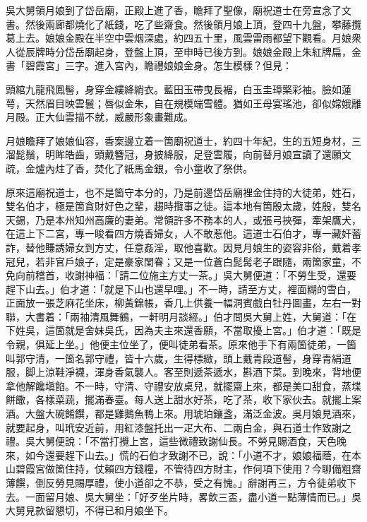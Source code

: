 吳大舅領月娘到了岱岳廟，正殿上進了香，瞻拜了聖像，廟祝道士在旁宣念了文書。然後兩廊都燒化了紙錢，吃了些齋食。然後領月娘上頂，登四十九盤，攀藤攬葛上去。娘娘金殿在半空中雲烟深處，約四五十里，風雲雷雨都望下觀看。{}月娘衆人從辰牌時分岱岳廟起身，登盤上頂，至申時已後方到。娘娘金殿上朱紅牌扁，金書「碧霞宮」三字。進入宮內，瞻禮娘娘金身。怎生模樣？但見：

\begin{myquote}
頭綰九龍飛鳳髻，身穿金縷絳綃衣。藍田玉帶曳長裾，白玉圭璋檠彩袖。臉如蓮萼，天然眉目映雲鬟；唇似金朱，自在規模端雪體。猶如王母宴瑤池，卻似嫦娥離月殿。正大仙雲描不就，威嚴形象畫難成。
\end{myquote}

月娘瞻拜了娘娘仙容，香案邊立着一箇廟祝道士，約四十年紀，生的五短身材，三溜髭鬚，明眸皓齒，頭戴簪冠，身披絳服，足登雲履，向前替月娘宣讀了還願文疏，金爐內炷了香，焚化了紙馬金銀，令小童收了祭供。

原來這廟祝道士，也不是箇守本分的，乃是前邊岱岳廟裡金住持的大徒弟，姓石，雙名伯才，極是箇貪財好色之輩，趨時攬事之徒。這本地有箇殷太歲，姓殷，雙名天錫，乃是本州知州高廉的妻弟。常領許多不務本的人，或張弓挾彈，牽架鷹犬，在這上下二宮，專一睃看四方燒香婦女，{}人不敢惹他。這道士石伯才，專一藏奸蓄詐，替他賺誘婦女到方丈，任意姦淫，取他喜歡。因見月娘生的姿容非俗，戴着孝冠兒，若非官戶娘子，定是豪家閨眷；又是一位蒼白髭髯老子跟隨，兩箇家童，{}不免向前稽首，收謝神福：「請二位施主方丈一茶。」吳大舅便道：「不勞生受，還要趕下山去。」伯才道：「就是下山也還早哩。」{}不一時，請至方丈，裡面糊的雪白，正面放一張芝麻花坐床，柳黃錦帳，香几上供養一幅洞賓戲白牡丹圖畫，{}左右一對聯，大書着：「兩袖清風舞鶴，一軒明月談經。」伯才問吳大舅上姓，大舅道：「在下姓吳，這箇就是舍妹吳氏，因為夫主來還香願，不當取擾上宮。」伯才道：「既是令親，俱延上坐。」他便主位坐了，便叫徒弟看茶。原來他手下有兩箇徒弟，一箇叫郭守清，一箇名郭守禮，皆十六歲，生得標緻，頭上戴青段道髻，身穿青絹道服，脚上涼鞋淨襪，渾身香氣襲人。{}客至則遞茶遞水，斟酒下菜。到晚來，背地便拿他解饞塡餡。不一時，守清、守禮安放桌兒，就擺齋上來，都是美口甜食，蒸堞餅饊，各樣菜蔬，擺滿春臺。每人送上甜水好茶，吃了茶，收下家伙去。就擺上案酒。大盤大碗餚饌，都是雞鵝魚鴨上來。用琥珀鑲盞，滿泛金波。吳月娘見酒來，就要起身，叫玳安近前，用紅漆盤托出一疋大布、二兩白金，與石道士作致謝之禮。吳大舅便說：「不當打攪上宮，這些微禮致謝仙長。不勞見賜酒食，天色晚來，如今還要趕下山去。」慌的石伯才致謝不已，說：「小道不才，娘娘福蔭，在本山碧霞宮做箇住持，仗賴四方錢糧，不管待四方財主，作何項下使用？今聊備粗齋薄饌，倒反勞見賜厚禮，使小道卻之不恭，受之有愧。」辭謝再三，方令徒弟收下去。一面留月娘、吳大舅坐：「好歹坐片時，畧飲三盃，盡小道一點薄情而已。」吳大舅見款留懇切，不得已和月娘坐下。

